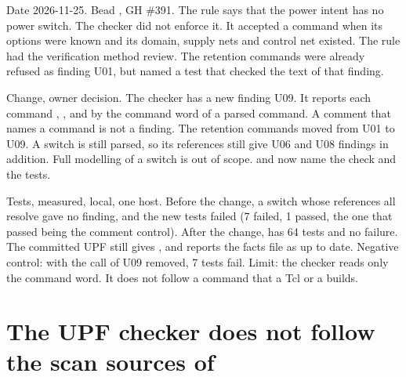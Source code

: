 \begin{record}

Date 2026-11-25. Bead , GH \#391. The rule  says that the power intent has no power switch. The checker  did not enforce it. It accepted a command  when its options were known and its domain, supply nets and control net existed. The rule had the verification method review. The retention commands were already refused as finding U01, but  named a test that checked the text of that finding.

\end{record}

\begin{record}

Change, owner decision. The checker has a new finding U09. It reports each command , ,  and  by the command word of a parsed command. A comment that names a command is not a finding. The retention commands moved from U01 to U09. A switch is still parsed, so its references still give U06 and U08 findings in addition. Full modelling of a switch is out of scope.  and  now name the check and the tests.

\end{record}

\begin{record}

Tests, measured, local, one host. Before the change, a switch whose references all resolve gave no finding, and the new tests failed (7 failed, 1 passed, the one that passed being the comment control). After the change,  has 64 tests and no failure. The committed UPF still gives , and  reports the facts file as up to date. Negative control: with the  call of U09 removed, 7 tests fail. Limit: the checker reads only the command word. It does not follow a command that a Tcl  or a  builds.

\end{record}

\section{The UPF checker does not follow the scan sources of }\label{cr:defect:upf-checker-tap-scan}


